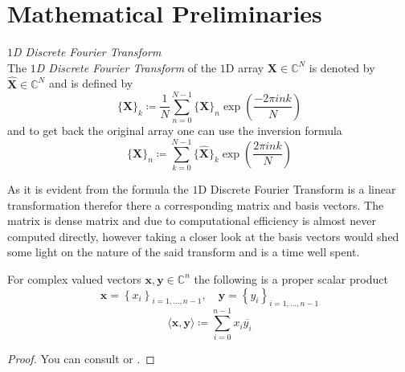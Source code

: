 \chapter{Mathematical Preliminaries}






\begin{Def}\label{def:1ddft}
    \emph{$1$D Discrete Fourier Transform}\\
    The \emph{$1$D Discrete Fourier Transform} of the $1$D array $\boldsymbol{X} \in \mathbb{C}^{N}$ is denoted by 
    $\hat {\boldsymbol{X}} \in \mathbb{C}^{N}$ and is defined by
    \begin{equation}\label{eq:1ddft}
        \{\hat {\boldsymbol{X}}\}_{k} \coloneqq \frac{1}{N}\sum_{n=0}^{N-1} \{{\boldsymbol{X}}\}_{n}\exp\left({\frac{-2\pi ink}{N}}\right)
    \end{equation}
    and to get back the original array one can use the inversion formula
    \begin{equation}\label{eq:1didft}
        \{{\boldsymbol{X}}\}_{n} \coloneqq \sum_{k=0}^{N-1}\{\hat {\boldsymbol{X}}\}_{k}\exp\left({\frac{2\pi ink}{N}}\right)
    \end{equation}    
\end{Def}

As it is evident from the formula the $1$D Discrete Fourier Transform is a linear transformation therefor 
there a corresponding matrix and basis vectors. The matrix is dense matrix and due to computational efficiency 
is almost never computed directly, however taking a closer look at the basis vectors would shed some light on 
the nature of the said transform and is a time well spent.

\begin{Prop}
    For complex valued vectors $\boldsymbol{x},\boldsymbol{y} \in \mathbb{C}^n$ the following is a proper scalar product
    \begin{equation*}
        \boldsymbol{x} = \left\{x_i\right\}_{i=1,\ldots,n-1}, \quad \boldsymbol{y} = \left\{y_i\right\}_{i=1,\ldots,n-1}
    \end{equation*}
    \begin{equation*}
        \langle\boldsymbol{x},\boldsymbol{y}\rangle \coloneqq \sum_{i=0}^{n-1} x_i \overline{y_i} 
    \end{equation*}
\end{Prop}

\begin{proof}
    You can consult \cite{wavelets_linear_algebra} or \cite{matrix_analysis_horn} \cite{numerical_tensor_hackbusch}.
\end{proof}






